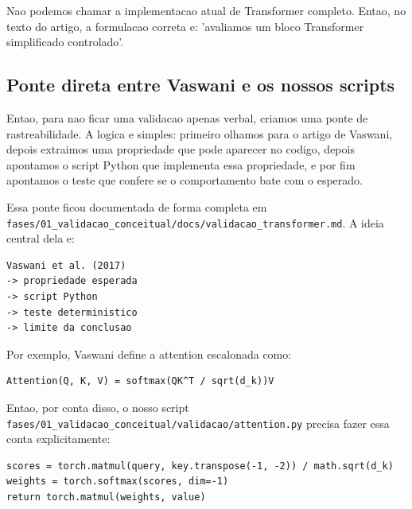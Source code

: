 Nao podemos chamar a implementacao atual de Transformer completo. Entao, no texto do artigo, a formulacao correta e: 'avaliamos um bloco Transformer simplificado controlado'.



\subsection{Ponte direta entre Vaswani e os nossos scripts}







Entao, para nao ficar uma validacao apenas verbal, criamos uma ponte de rastreabilidade. A logica e simples: primeiro olhamos para o artigo de Vaswani, depois extraimos uma propriedade que pode aparecer no codigo, depois apontamos o script Python que implementa essa propriedade, e por fim apontamos o teste que confere se o comportamento bate com o esperado.




Essa ponte ficou documentada de forma completa em \texttt{fases/\allowbreak{}01\_\allowbreak{}validacao\_\allowbreak{}conceitual/\allowbreak{}docs/\allowbreak{}validacao\_\allowbreak{}transformer.\allowbreak{}md}. A ideia central dela e:



\begin{Verbatim}[fontsize=\small,breaklines=true,label=text]
Vaswani et al. (2017)
-> propriedade esperada
-> script Python
-> teste deterministico
-> limite da conclusao
\end{Verbatim}



Por exemplo, Vaswani define a attention escalonada como:



\begin{Verbatim}[fontsize=\small,breaklines=true,label=text]
Attention(Q, K, V) = softmax(QK^T / sqrt(d_k))V
\end{Verbatim}




Entao, por conta disso, o nosso script \texttt{fases/\allowbreak{}01\_\allowbreak{}validacao\_\allowbreak{}conceitual/\allowbreak{}validacao/\allowbreak{}attention.\allowbreak{}py} precisa fazer essa conta explicitamente:



\begin{Verbatim}[fontsize=\small,breaklines=true,label=python]
scores = torch.matmul(query, key.transpose(-1, -2)) / math.sqrt(d_k)
weights = torch.softmax(scores, dim=-1)
return torch.matmul(weights, value)
\end{Verbatim}







